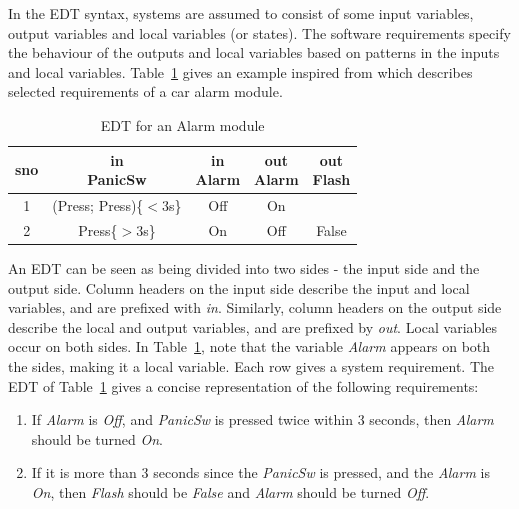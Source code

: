 In the EDT syntax, systems are assumed to consist
of some input variables, output variables and local variables (or
states). The software requirements specify the
behaviour of the outputs and local variables based on patterns
in the inputs and local variables. Table~\ref{tab:edt-alarm-intro} gives an example inspired from
\cite{DBLP:conf/enase/VenkateshSZA15a} which describes selected requirements of a
car alarm module.

\begin{table}[h!]
  \centering {}
  \caption{EDT for an Alarm module}
  \label{tab:edt-alarm-intro}
  \begin{tabular}{|c|c|c||c|c|}
    \hline
    sno &\specialcell{in \\ PanicSw} &
                                                                       \specialcell{in 
    \\ Alarm} & \specialcell{out \\ Alarm} & 
                                             \specialcell{out \\ Flash} \\
    \hline 
    1 & (Press; Press)\{$<3$s\} & Off & On &
    \\
    \hline
    2 & Press\{$>3$s\} & On & Off & False \\
    \hline
  \end{tabular}
  
\end{table}
An EDT can be seen as being divided into two sides - the input side
and the output side. Column headers on the input side describe the
input and local variables, and are prefixed with \emph{in}. Similarly,
column headers on the output side describe the local and output
variables, and are prefixed by \emph{out}. Local variables occur on
both sides. In Table~\ref{tab:edt-alarm-intro}, note that the variable
\emph{Alarm} appears on both the sides, making it a local
variable. Each row gives a system requirement. The EDT of
Table~\ref{tab:edt-alarm-intro} gives a concise representation of the
following requirements:
\begin{enumerate}
\item If \emph{Alarm} is \emph{Off}, and
  \emph{PanicSw} is pressed twice within $3$ seconds, then
  \emph{Alarm} should be turned \emph{On}.

\item If it is more than $3$ seconds since the \emph{PanicSw} is
  pressed, and the \emph{Alarm} is \emph{On}, then \emph{Flash}
  should be \emph{False} and \emph{Alarm} should be turned \emph{Off}.
\end{enumerate}

